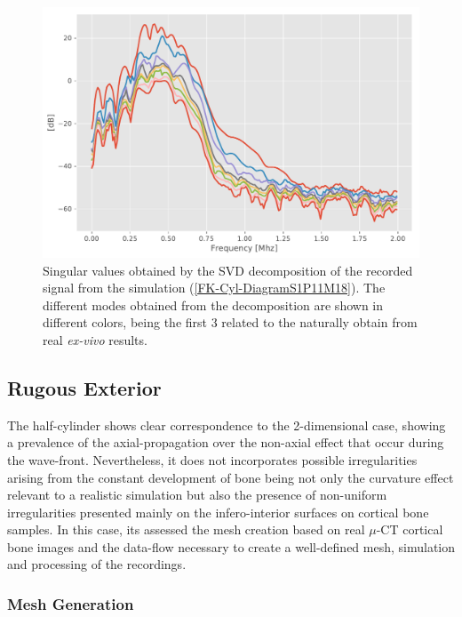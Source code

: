\begin{figure}[!h]  
	\centering
	\includegraphics[scale=.6]{images/ClusterSim/3DCylTimeP11TransIsoFKW18_SV.pdf}
	\caption{Singular values obtained by the SVD decomposition of the recorded signal from the simulation (\ref{FK-Cyl-DiagramS1P11M18}). The different modes obtained from the decomposition are shown in different colors, being the first 3 related to the naturally obtain from real \textit{ex-vivo} results.}
	\label{SVD-Cyl-S1P11M18}
\end{figure}


\subsection{Rugous Exterior}
The half-cylinder shows clear correspondence to the 2-dimensional case, showing a prevalence of the axial-propagation over the non-axial effect that occur during the wave-front. Nevertheless, it does not incorporates possible irregularities arising from the constant development of bone being not only the curvature effect relevant to a realistic simulation but also the presence of non-uniform irregularities presented mainly on the infero-interior surfaces on cortical bone samples. In this case, its assessed the mesh creation based on real $\mu$-CT cortical bone images and the data-flow necessary to create a well-defined mesh, simulation and processing of the recordings.

\subsubsection{Mesh Generation}

